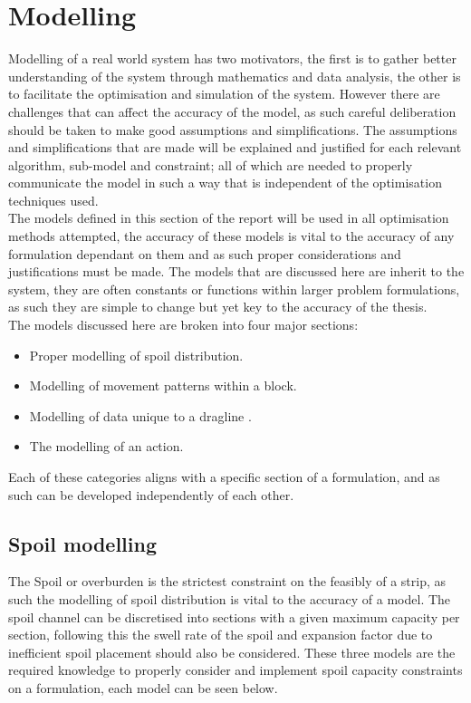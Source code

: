 
\section{Modelling}
Modelling of a real world system has two motivators, the first is to gather better understanding of the system through mathematics and data analysis, the other is to facilitate the optimisation and simulation of the system. However there are challenges that can affect the accuracy of the model, as such careful deliberation should be taken to make good assumptions and simplifications. The assumptions and simplifications that are made will be explained and justified for each relevant algorithm, sub-model and constraint; all of which are needed to properly communicate the model in such a way that is independent of the optimisation techniques used.  
\\
The models defined in this section of the report will be used in all optimisation methods attempted, the accuracy of these models is vital to the accuracy of any formulation dependant on them and as such proper considerations and justifications must be made. The models that are discussed here are inherit to the system, they are often constants or functions within larger problem formulations, as such they are simple to change but yet key to the accuracy of the thesis. \\
The models discussed here are broken into four major sections:
\begin{itemize}
 \item Proper modelling of spoil distribution.
\item Modelling of movement patterns within a block.
\item Modelling of data unique to a dragline .
\item The modelling of an action.
\end{itemize} 
Each of these categories aligns with a specific section of a formulation, and as such can be developed independently of each other. 
\subsection{Spoil modelling}
The Spoil or overburden is the strictest constraint on the feasibly of a strip, as such the modelling of spoil distribution is vital to the accuracy of a model. The spoil channel can be discretised into sections with a given maximum capacity per section, following this the swell rate of the spoil and expansion factor due to inefficient spoil placement should also be considered. These three models are the required knowledge to properly consider and implement spoil capacity constraints on a formulation, each model can be seen below. 
